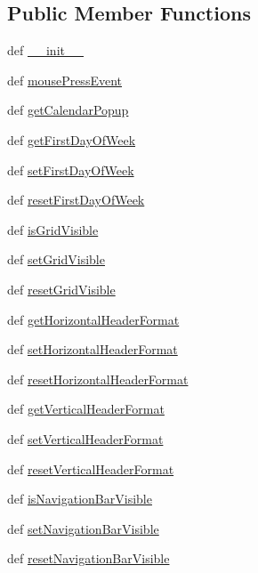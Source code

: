 \subsection*{Public Member Functions}
\begin{DoxyCompactItemize}
\item 
def \hyperlink{classdatetimeedit_1_1PyDateEdit_a392fe3dbecaf977e23339d0b7180d6fe}{\+\_\+\+\_\+init\+\_\+\+\_\+}
\item 
def \hyperlink{classdatetimeedit_1_1PyDateEdit_af816347a09e5179f04bbf347ebc6c382}{mouse\+Press\+Event}
\item 
def \hyperlink{classdatetimeedit_1_1PyDateEdit_a13059e3fdf19fa728e7c336eea2ad894}{get\+Calendar\+Popup}
\item 
def \hyperlink{classdatetimeedit_1_1PyDateEdit_acc4974edec6569290fbb26499d0f5cba}{get\+First\+Day\+Of\+Week}
\item 
def \hyperlink{classdatetimeedit_1_1PyDateEdit_a180a0939e36e7fa1ce54ee7b94ae0edc}{set\+First\+Day\+Of\+Week}
\item 
def \hyperlink{classdatetimeedit_1_1PyDateEdit_a6dd2a295d7a2c7a02693d8c86eeb0b41}{reset\+First\+Day\+Of\+Week}
\item 
def \hyperlink{classdatetimeedit_1_1PyDateEdit_a4cfbcccee220bdb3eb68010cc31dd69c}{is\+Grid\+Visible}
\item 
def \hyperlink{classdatetimeedit_1_1PyDateEdit_af9ce71014c6ae7b84e267b881656846c}{set\+Grid\+Visible}
\item 
def \hyperlink{classdatetimeedit_1_1PyDateEdit_a22acfd3949855a34646b8d1991890529}{reset\+Grid\+Visible}
\item 
def \hyperlink{classdatetimeedit_1_1PyDateEdit_a5c964f31bc650c80120a21dcab4f6582}{get\+Horizontal\+Header\+Format}
\item 
def \hyperlink{classdatetimeedit_1_1PyDateEdit_af0fcc83a59befd9921e529ca23b6c0a5}{set\+Horizontal\+Header\+Format}
\item 
def \hyperlink{classdatetimeedit_1_1PyDateEdit_a88c91418b7ac38ea699c886896a51cc7}{reset\+Horizontal\+Header\+Format}
\item 
def \hyperlink{classdatetimeedit_1_1PyDateEdit_ab5e3e530b830fcfa86c81e0cac45c061}{get\+Vertical\+Header\+Format}
\item 
def \hyperlink{classdatetimeedit_1_1PyDateEdit_a4d1cff6ad92cbaab32e2d7673d887219}{set\+Vertical\+Header\+Format}
\item 
def \hyperlink{classdatetimeedit_1_1PyDateEdit_ac4fdc88d54c7964fea73382f5071a6d1}{reset\+Vertical\+Header\+Format}
\item 
def \hyperlink{classdatetimeedit_1_1PyDateEdit_a9823450835bcb0355690cdd2f4f9409d}{is\+Navigation\+Bar\+Visible}
\item 
def \hyperlink{classdatetimeedit_1_1PyDateEdit_a833aaf05bf8ad48700335201829bddad}{set\+Navigation\+Bar\+Visible}
\item 
def \hyperlink{classdatetimeedit_1_1PyDateEdit_af244fab3affa0489d9bc87438ab4aa61}{reset\+Navigation\+Bar\+Visible}
\end{DoxyCompactItemize}
